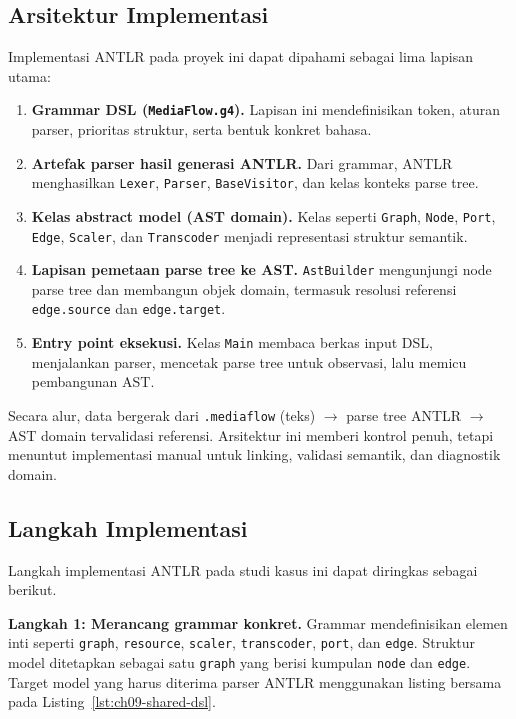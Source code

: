 \subsection{Arsitektur Implementasi}

Implementasi ANTLR pada proyek ini dapat dipahami sebagai lima lapisan utama:
\begin{enumerate}
  \item \textbf{Grammar DSL (\texttt{MediaFlow.g4}).} Lapisan ini mendefinisikan token, aturan parser, prioritas struktur, serta bentuk konkret bahasa.
  \item \textbf{Artefak parser hasil generasi ANTLR.} Dari grammar, ANTLR menghasilkan \texttt{Lexer}, \texttt{Parser}, \texttt{BaseVisitor}, dan kelas konteks parse tree.
  \item \textbf{Kelas abstract model (AST domain).} Kelas seperti \texttt{Graph}, \texttt{Node}, \texttt{Port}, \texttt{Edge}, \texttt{Scaler}, dan \texttt{Transcoder} menjadi representasi struktur semantik.
  \item \textbf{Lapisan pemetaan parse tree ke AST.} \texttt{AstBuilder} mengunjungi node parse tree dan membangun objek domain, termasuk resolusi referensi \texttt{edge.source} dan \texttt{edge.target}.
  \item \textbf{Entry point eksekusi.} Kelas \texttt{Main} membaca berkas input DSL, menjalankan parser, mencetak parse tree untuk observasi, lalu memicu pembangunan AST.
\end{enumerate}

Secara alur, data bergerak dari \texttt{.mediaflow} (teks) $\rightarrow$ parse tree ANTLR $\rightarrow$ AST domain tervalidasi referensi. Arsitektur ini memberi kontrol penuh, tetapi menuntut implementasi manual untuk linking, validasi semantik, dan diagnostik domain.

\subsection{Langkah Implementasi}

Langkah implementasi ANTLR pada studi kasus ini dapat diringkas sebagai berikut.

\textbf{Langkah 1: Merancang grammar konkret.} Grammar mendefinisikan elemen inti seperti \texttt{graph}, \texttt{resource}, \texttt{scaler}, \texttt{transcoder}, \texttt{port}, dan \texttt{edge}. Struktur model ditetapkan sebagai satu \texttt{graph} yang berisi kumpulan \texttt{node} dan \texttt{edge}. Target model yang harus diterima parser ANTLR menggunakan listing bersama pada Listing~\ref{lst:ch09-shared-dsl}.

